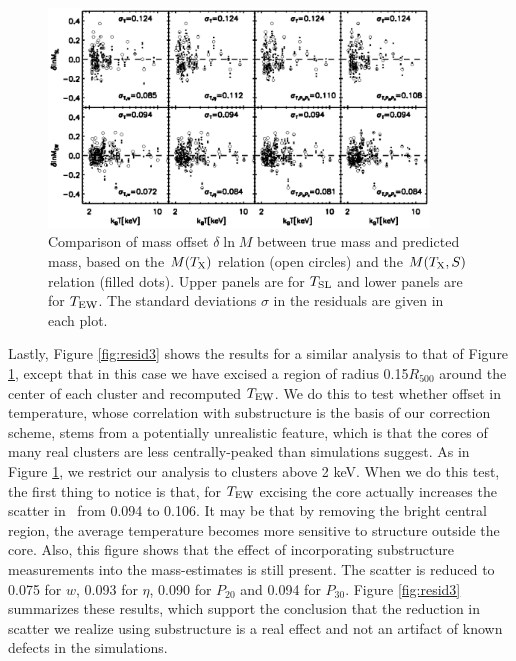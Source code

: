 \documentclass{aastex} \usepackage{natbib}
\begin{document}
\begin{figure}[b]
  \centering
  \includegraphics[width=0.9\textwidth]{f8.eps}
  \caption{Comparison of mass offset $\delta \ln M$ between true mass
    and predicted mass, based on the $M(T_{\rm X})$ relation (open circles)
    and the $M(T_{\rm X},S)$ relation (filled dots).  Upper panels are for
    $T_{\rm SL}$ and lower panels are for $T_{\rm EW}$.  The standard deviations
    $\sigma$ in the residuals are given in each plot.}
  \label{fig:resid2}
\end{figure}

Lastly, Figure \ref{fig:resid3} shows the results for a similar
analysis to that of Figure \ref{fig:resid2}, except that in this case
we have excised a region of radius 0.15$R_{500}$ around the center of
each cluster and recomputed $T_{\rm EW}$.  We do this to test whether offset
in temperature, whose correlation with substructure is the basis of
our correction scheme, stems from a potentially unrealistic feature,
which is that the cores of many real clusters are less
centrally-peaked than simulations suggest.  As in Figure
\ref{fig:resid2}, we restrict our analysis to clusters above 2 keV.
When we do this test, the first thing to notice is that, for $T_{\rm EW}$
excising the core actually increases the scatter in \mtx\ from 0.094
to 0.106.  It may be that by removing the bright central region, the
average temperature becomes more sensitive to structure outside the
core.  Also, this figure shows that the effect of incorporating
substructure measurements into the mass-estimates is still present.
The scatter is reduced to 0.075 for $w$, 0.093 for $\eta$, 0.090 for
$P_{20}$ and 0.094 for $P_{30}$.  Figure \ref{fig:resid3} summarizes
these results, which support the conclusion that the reduction in
scatter we realize using substructure is a real effect and not an
artifact of known defects in the simulations.
\end{document}
